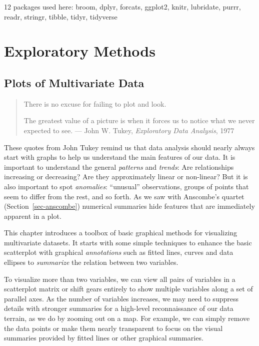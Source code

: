 \documentclass[
  letterpaper,
  10pt,
  krantz2]{krantz}
\begin{document}
12 packages used here: broom, dplyr, forcats, ggplot2, knitr, lubridate,
purrr, readr, stringr, tibble, tidyr, tidyverse

\part{Exploratory Methods}

\chapter{Plots of Multivariate Data}\label{sec-multivariate_plots}

\begin{quote}
There is no excuse for failing to plot and look.

The greatest value of a picture is when it forces us to notice what we
never expected to see. --- John W. Tukey, \emph{Exploratory Data
Analysis}, 1977
\end{quote}

These quotes from John Tukey remind us that data analysis should nearly
always start with graphs to help us understand the main features of our
data. It is important to understand the general \emph{patterns} and
\emph{trends}: Are relationships increasing or decreasing? Are they
approximately linear or non-linear? But it is also important to spot
\emph{anomalies}: ``unusual'' observations, groups of points that seem
to differ from the rest, and so forth. As we saw with Anscombe's quartet
(Section~\ref{sec-anscombe}) numerical summaries hide features that are
immediately apparent in a plot.

This chapter introduces a toolbox of basic graphical methods for
visualizing multivariate datasets. It starts with some simple techniques
to enhance the basic scatterplot with graphical \emph{annotations} such
as fitted lines, curves and data ellipses to \emph{summarize} the
relation between two variables.

To visualize more than two variables, we can view all pairs of variables
in a scatterplot matrix or shift gears entirely to show multiple
variables along a set of parallel axes. As the number of variables
increases, we may need to suppress details with stronger summaries for a
high-level reconnaissance of our data terrain, as we do by zooming out
on a map. For example, we can simply remove the data points or make them
nearly transparent to focus on the visual summaries provided by fitted
lines or other graphical summaries.
\end{document}
